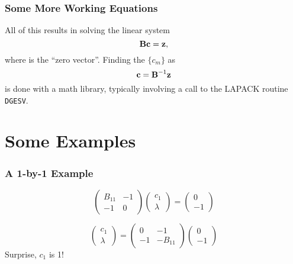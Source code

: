 \documentclass[10pt,compress,red]{beamer}
\begin{document}
\begin{frame}
  \frametitle{Some More Working Equations}
  All of this results in solving the linear system
  \begin{equation}
    \boldsymbol{\mathbf{B}} \boldsymbol{\mathbf{c}} = \boldsymbol{\mathbf{z}},
  \end{equation}
  where  is the ``zero vector''. Finding the \(\{c_{m}\}\) as
  \begin{equation}
    \boldsymbol{\mathbf{c}} = \boldsymbol{\mathbf{B}}^{-1} \boldsymbol{\mathbf{z}}
  \end{equation}
  is done with a math library, typically involving a call to the
  LAPACK routine \texttt{DGESV}.
\end{frame}

\section{Some Examples}

\begin{frame}
  \frametitle{A 1-by-1 Example}

  \begin{equation}
    \begin{pmatrix}
      B_{11} & -1 \\
      -1 & 0
    \end{pmatrix}
    \begin{pmatrix}
      c_{1} \\ \lambda
    \end{pmatrix}
    =
    \begin{pmatrix}
      0 \\ -1
    \end{pmatrix}
  \end{equation}

  \begin{equation}
    \begin{pmatrix}
      c_{1} \\ \lambda
    \end{pmatrix}
    =
    \begin{pmatrix}
      0 & -1 \\
      -1 & -B_{11}
    \end{pmatrix}
    \begin{pmatrix}
      0 \\ -1
    \end{pmatrix}
  \end{equation}
  Surprise, \(c_{1}\) is 1!
\end{frame}
\end{document}
